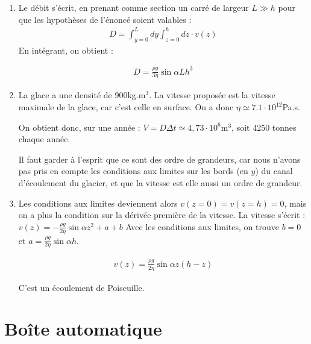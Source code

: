 \begin{correction}
\begin{enumerate}
\begin{align*}
	v(z)=\frac{\rho g}{\eta}\sin\alpha z\left( h-\frac{z}{2}\right) 
\end{align*}

Le profil de vitesse est parabolique.

\item Le débit s'écrit, en prenant comme section un carré de largeur $L\gg h$ pour que les hypothèses de l'énoncé soient valables : 
\begin{align*}
	D=\int_{y=0}^{L}dy\int_{z=0}^h dz\cdot v(z)
\end{align*}
En intégrant, on obtient :

\begin{align*}
	D=\frac{\rho g}{3\eta}\sin\alpha L h^3
\end{align*}

\item La glace a une densité de 900kg.m$^3$. La vitesse proposée est la vitesse maximale de la glace, car c'est celle en surface. On a donc $\eta\simeq7.1\cdot10^{12}$Pa.s.

On obtient donc, sur une année : $V=D\Delta t\simeq4,73\cdot10^6$m$^3$, soit 4250 tonnes chaque année. 

Il faut garder à l'esprit que ce sont des ordre de grandeurs, car nous n'avons pas pris en compte les conditions aux limites sur les bords (en $y$) du canal d'écoulement du glacier, et que la vitesse est elle aussi un ordre de grandeur. 

\item[$\blacktriangleright$] Les conditions aux limites deviennent alors $v(z=0)=v(z=h)=0$, mais on a plus la condition sur la dérivée première de la vitesse. 
La vitesse s'écrit : $v(z)=-\frac{\rho g}{2\eta}\sin\alpha z^2 +a +b$
Avec les conditions aux limites, on trouve $b=0$ et $a=\frac{\rho g}{2\eta}\sin\alpha h$.

\begin{align*}
	v(z)=\frac{\rho g}{2\eta}\sin\alpha z\left( h-z\right) 
\end{align*}

C'est un écoulement de Poiseuille. 

\end{enumerate}

\end{correction}

\newpage

\section{Boîte automatique}

